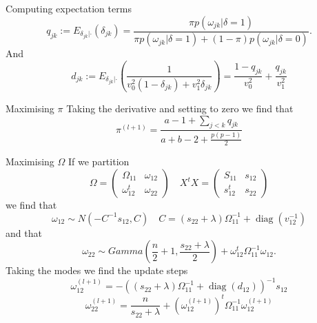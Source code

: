 \documentclass{beamer}
\DeclareMathOperator{\diag}{diag}
\begin{document}
\begin{frame}{Computing expectation terms}
	\[q_{jk} := E_{\delta_{jk} | \cdot}(\delta_{jk}) = \frac{\pi p(\omega_{jk} | \delta = 1)}{\pi p(\omega_{jk}
			| \delta = 1) + (1 - \pi) p(\omega_{jk} | \delta = 0)}.\]
	And
	\[ d_{jk} := E_{\delta_{jk} | \cdot}\left(\frac{1}{v_0^2 (1 - \delta_{jk}) + v_1^2
				\delta_{jk}}\right) = \frac{1 - q_{jk}}{v_0^2} + \frac{q_{jk}}{v_1^2} \]
\end{frame}
\begin{frame}{Maximising $\pi$}
	Taking the derivative and setting to zero we find that
	\[\pi^{(l+1)} = \frac{a - 1 + \sum_{j<k} q_{jk}}{a + b - 2 + \frac{p(p-1)}{2}}\]
\end{frame}
\begin{frame}{Maximising $\Omega$}
	If we partition
	\[\Omega = \begin{pmatrix}
			\Omega_{11}   & \omega_{12} \\
			\omega_{12}^t & \omega_{22}
		\end{pmatrix}
		\quad
		X^t X = \begin{pmatrix}
			S_{11}   & s_{12} \\
			s_{12}^t & s_{22}
		\end{pmatrix}
	\]
	we find that
	\[\omega_{12} \sim N(-C^{-1}s_{12}, C) \quad C=(s_{22} + \lambda) \Omega_{11}^{-1} + \diag(v_{12}^{-1})\]
	and that
	\[\omega_{22} \sim Gamma\left(\frac{n}{2} + 1, \frac{s_{22} +
			\lambda}{2}\right) + \omega_{12}^t\Omega_{11}^{-1}\omega_{12}.\]
	Taking the modes we find the update steps
	\[\omega_{12}^{(l+1)} = -((s_{22} + \lambda) \Omega_{11}^{-1} + \diag(d_{12}))^{-1} s_{12} \]
	\[\omega_{22}^{(l+1)} = \frac{n}{s_{22} + \lambda} + (\omega_{12}^{(l+1)})^t \Omega_{11}^{-1}\omega_{12}^{(l+1)}\]
\end{frame}
\end{document}
